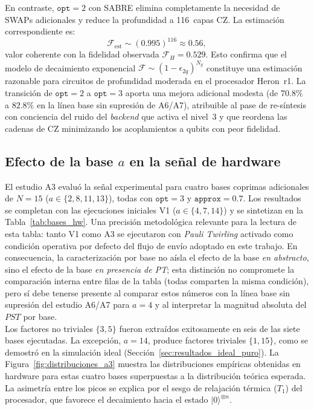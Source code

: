 \documentclass[12pt, spanish]{book}
\begin{document}
En contraste, $\texttt{opt} = 2$ con SABRE elimina completamente la necesidad de SWAPs adicionales y reduce la profundidad a 116~capas CZ. La estimación correspondiente es:
\begin{equation}
    \mathcal{F}_{\text{est}} \sim (0.995)^{116} \approx 0.56,
    \label{eq:fidelidad_opt2}
\end{equation}
valor coherente con la fidelidad observada $\mathcal{F}_H = 0.529$. Esto confirma que el modelo de decaimiento exponencial $\mathcal{F} \sim (1 - \epsilon_{2q})^{N_g}$ constituye una estimación razonable para circuitos de profundidad moderada en el procesador Heron~r1. La transición de $\texttt{opt}=2$ a $\texttt{opt}=3$ aporta una mejora adicional modesta (de $70.8\%$ a $82.8\%$ en la línea base sin supresión de A6/A7), atribuible al pase de re-síntesis con conciencia del ruido del \textit{backend} que activa el nivel~3 y que reordena las cadenas de CZ minimizando los acoplamientos a qubits con peor fidelidad.

\subsection{Efecto de la base $a$ en la señal de hardware}
\label{subsec:efecto_a}

El estudio A3 evaluó la señal experimental para cuatro bases coprimas adicionales de $N = 15$ ($a \in \{2, 8, 11, 13\}$), todas con $\texttt{opt} = 3$ y $\texttt{approx} = 0.7$. Los resultados se completan con las ejecuciones iniciales V1 ($a \in \{4, 7, 14\}$) y se sintetizan en la Tabla~\ref{tab:bases_hw}. Una precisión metodológica relevante para la lectura de esta tabla: tanto V1 como A3 se ejecutaron con \textit{Pauli Twirling} activado como condición operativa por defecto del flujo de envío adoptado en este trabajo. En consecuencia, la caracterización por base no aísla el efecto de la base \emph{en abstracto}, sino el efecto de la base \emph{en presencia de PT}; esta distinción no compromete la comparación interna entre filas de la tabla (todas comparten la misma condición), pero sí debe tenerse presente al comparar estos números con la línea base sin supresión del estudio A6/A7 para $a=4$ y al interpretar la magnitud absoluta del $PST$ por base.\\

Los factores no triviales $\{3, 5\}$ fueron extraídos exitosamente en seis de las siete bases ejecutadas. La excepción, $a = 14$, produce factores triviales $\{1, 15\}$, como se demostró en la simulación ideal (Sección~\ref{sec:resultados_ideal_puro}).
La Figura~\ref{fig:distribuciones_a3} muestra las distribuciones empíricas obtenidas en hardware para estas cuatro bases superpuestas a la distribución teórica esperada. 
La asimetría entre los picos se explica por el sesgo de relajación térmica ($T_1$) del procesador, que favorece el decaimiento hacia el estado $|0\rangle^{\otimes n}$.
\end{document}
